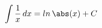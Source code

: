 \documentclass[preview]{standalone}
\begin{document}
\begin{align*}
\int \frac{1}{x}\, dx = ln \, \abs(x) + C
\end{align*}
\end{document}

